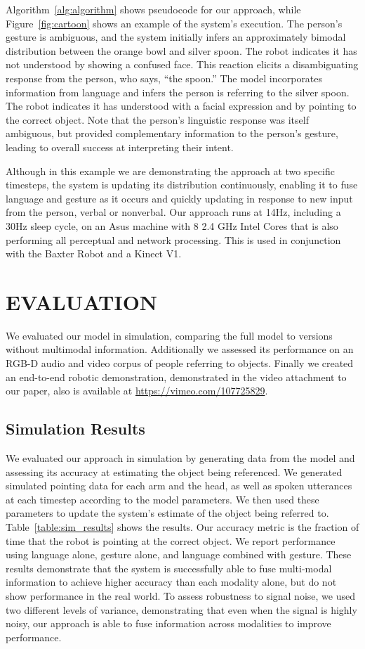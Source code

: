 \documentclass[letterpaper, 10 pt, conference]{ieeeconf}
\begin{document}
Algorithm~\ref{alg:algorithm} shows pseudocode for our approach, while
Figure~\ref{fig:cartoon} shows an example of the system's execution.
The person's gesture is ambiguous, and the system initially infers an
approximately bimodal distribution between the orange bowl and silver
spoon.  The robot indicates it has not understood by showing a
confused face.  This reaction elicits a disambiguating response from
the person, who says, ``the spoon.''  The model incorporates
information from language and infers the person is referring to the
silver spoon.  The robot indicates it has understood with a facial
expression and by pointing to the correct object.  Note that the
person's linguistic response was itself ambiguous, but provided
complementary information to the person's gesture, leading to overall
success at interpreting their intent.

Although in this example we are demonstrating the approach at two
specific timesteps, the system is updating its distribution
continuously, enabling it to fuse language and gesture as it occurs
and quickly updating in response to new input from the person, verbal
or nonverbal.  Our approach runs at 14Hz, including a 30Hz sleep
cycle, on an Asus machine with 8 2.4 GHz Intel Cores that is also
performing all perceptual and network processing. This is used in conjunction with the Baxter Robot and a Kinect V1.

\section{EVALUATION}

We evaluated our model in simulation, comparing the full model to
versions without multimodal information.  Additionally we assessed its
performance on an RGB-D audio and video corpus of people referring to
objects.  Finally we created an end-to-end robotic demonstration,
demonstrated in the video attachment to our paper, also is available
at \url{https://vimeo.com/107725829}.

\subsection{Simulation Results}

We evaluated our approach in simulation by generating data from the
model and assessing its accuracy at estimating the object being
referenced.  We generated simulated pointing data for each arm and the
head, as well as spoken utterances at each timestep according to the
model parameters.  We then used these parameters to update the
system's estimate of the object being referred to.
Table~\ref{table:sim_results} shows the results.  Our accuracy metric
is the fraction of time that the robot is pointing at the correct
object.  We report performance using language alone, gesture alone,
and language combined with gesture.  These results demonstrate that
the system is successfully able to fuse multi-modal information to
achieve higher accuracy than each modality alone, but do not show
performance in the real world.  To assess robustness to signal noise,
we used two different levels of variance, demonstrating that even when
the signal is highly noisy, our approach is able to fuse information
across modalities to improve performance.
\end{document}
